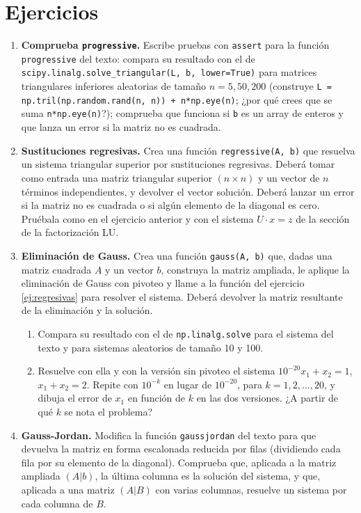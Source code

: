 \section{Ejercicios}
\begin{enumerate}
\item \label{ej:progresivas} \textbf{Comprueba \texttt{progressive}.} Escribe pruebas con \texttt{assert} para la función \texttt{progressive} del texto: compara su resultado con el de \texttt{scipy.linalg.solve\_triangular(L, b, lower=True)} para matrices triangulares inferiores aleatorias de tamaño $n=5, 50, 200$ (construye \texttt{L = np.tril(np.random.rand(n, n)) + n*np.eye(n)}; ¿por qué crees que se suma \texttt{n*np.eye(n)}?); comprueba que funciona si \texttt{b} es un array de enteros y que lanza un error si la matriz no es cuadrada.

\item \label{ej:regresivas} \textbf{Sustituciones regresivas.} Crea una función \texttt{regressive(A, b)} que resuelva un sistema triangular superior por sustituciones regresivas. Deberá tomar como entrada una matriz triangular superior $(n\times n)$ y un vector de $n$ términos independientes, y devolver el vector solución. Deberá lanzar un error si la matriz no es cuadrada o si algún elemento de la diagonal es cero. Pruébala como en el ejercicio anterior y con el sistema $U\cdot x = z$ de la sección de la factorización LU.

\item \label{ej:gauss} \textbf{Eliminación de Gauss.} Crea una función \texttt{gauss(A, b)} que, dadas una matriz cuadrada $A$ y un vector $b$, construya la matriz ampliada, le aplique la eliminación de Gauss con pivoteo y llame a la función del ejercicio \ref{ej:regresivas} para resolver el sistema. Deberá devolver la matriz resultante de la eliminación y la solución.
\begin{enumerate}
\item Compara su resultado con el de \texttt{np.linalg.solve} para el sistema del texto y para sistemas aleatorios de tamaño 10 y 100.
\item Resuelve con ella y con la versión sin pivoteo el sistema $10^{-20}x_1+x_2=1$, $x_1+x_2=2$. Repite con $10^{-k}$ en lugar de $10^{-20}$, para $k=1,2,\dots,20$, y dibuja el error de $x_1$ en función de $k$ en las dos versiones. ¿A partir de qué $k$ se nota el problema?
\end{enumerate}

\item \label{ej:gaussjordan} \textbf{Gauss-Jordan.} Modifica la función \texttt{gaussjordan} del texto para que devuelva la matriz en forma escalonada reducida por filas (dividiendo cada fila por su elemento de la diagonal). Comprueba que, aplicada a la matriz ampliada $(A\vert b)$, la última columna es la solución del sistema, y que, aplicada a una matriz $(A\vert B)$ con varias columnas, resuelve un sistema por cada columna de $B$.


\end{enumerate}

